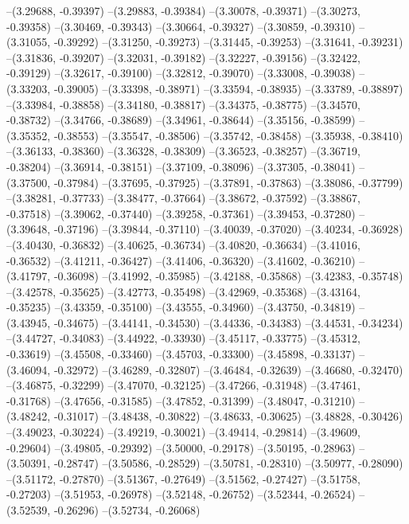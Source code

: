 --(3.29688, -0.39397)
--(3.29883, -0.39384)
--(3.30078, -0.39371)
--(3.30273, -0.39358)
--(3.30469, -0.39343)
--(3.30664, -0.39327)
--(3.30859, -0.39310)
--(3.31055, -0.39292)
--(3.31250, -0.39273)
--(3.31445, -0.39253)
--(3.31641, -0.39231)
--(3.31836, -0.39207)
--(3.32031, -0.39182)
--(3.32227, -0.39156)
--(3.32422, -0.39129)
--(3.32617, -0.39100)
--(3.32812, -0.39070)
--(3.33008, -0.39038)
--(3.33203, -0.39005)
--(3.33398, -0.38971)
--(3.33594, -0.38935)
--(3.33789, -0.38897)
--(3.33984, -0.38858)
--(3.34180, -0.38817)
--(3.34375, -0.38775)
--(3.34570, -0.38732)
--(3.34766, -0.38689)
--(3.34961, -0.38644)
--(3.35156, -0.38599)
--(3.35352, -0.38553)
--(3.35547, -0.38506)
--(3.35742, -0.38458)
--(3.35938, -0.38410)
--(3.36133, -0.38360)
--(3.36328, -0.38309)
--(3.36523, -0.38257)
--(3.36719, -0.38204)
--(3.36914, -0.38151)
--(3.37109, -0.38096)
--(3.37305, -0.38041)
--(3.37500, -0.37984)
--(3.37695, -0.37925)
--(3.37891, -0.37863)
--(3.38086, -0.37799)
--(3.38281, -0.37733)
--(3.38477, -0.37664)
--(3.38672, -0.37592)
--(3.38867, -0.37518)
--(3.39062, -0.37440)
--(3.39258, -0.37361)
--(3.39453, -0.37280)
--(3.39648, -0.37196)
--(3.39844, -0.37110)
--(3.40039, -0.37020)
--(3.40234, -0.36928)
--(3.40430, -0.36832)
--(3.40625, -0.36734)
--(3.40820, -0.36634)
--(3.41016, -0.36532)
--(3.41211, -0.36427)
--(3.41406, -0.36320)
--(3.41602, -0.36210)
--(3.41797, -0.36098)
--(3.41992, -0.35985)
--(3.42188, -0.35868)
--(3.42383, -0.35748)
--(3.42578, -0.35625)
--(3.42773, -0.35498)
--(3.42969, -0.35368)
--(3.43164, -0.35235)
--(3.43359, -0.35100)
--(3.43555, -0.34960)
--(3.43750, -0.34819)
--(3.43945, -0.34675)
--(3.44141, -0.34530)
--(3.44336, -0.34383)
--(3.44531, -0.34234)
--(3.44727, -0.34083)
--(3.44922, -0.33930)
--(3.45117, -0.33775)
--(3.45312, -0.33619)
--(3.45508, -0.33460)
--(3.45703, -0.33300)
--(3.45898, -0.33137)
--(3.46094, -0.32972)
--(3.46289, -0.32807)
--(3.46484, -0.32639)
--(3.46680, -0.32470)
--(3.46875, -0.32299)
--(3.47070, -0.32125)
--(3.47266, -0.31948)
--(3.47461, -0.31768)
--(3.47656, -0.31585)
--(3.47852, -0.31399)
--(3.48047, -0.31210)
--(3.48242, -0.31017)
--(3.48438, -0.30822)
--(3.48633, -0.30625)
--(3.48828, -0.30426)
--(3.49023, -0.30224)
--(3.49219, -0.30021)
--(3.49414, -0.29814)
--(3.49609, -0.29604)
--(3.49805, -0.29392)
--(3.50000, -0.29178)
--(3.50195, -0.28963)
--(3.50391, -0.28747)
--(3.50586, -0.28529)
--(3.50781, -0.28310)
--(3.50977, -0.28090)
--(3.51172, -0.27870)
--(3.51367, -0.27649)
--(3.51562, -0.27427)
--(3.51758, -0.27203)
--(3.51953, -0.26978)
--(3.52148, -0.26752)
--(3.52344, -0.26524)
--(3.52539, -0.26296)
--(3.52734, -0.26068)
